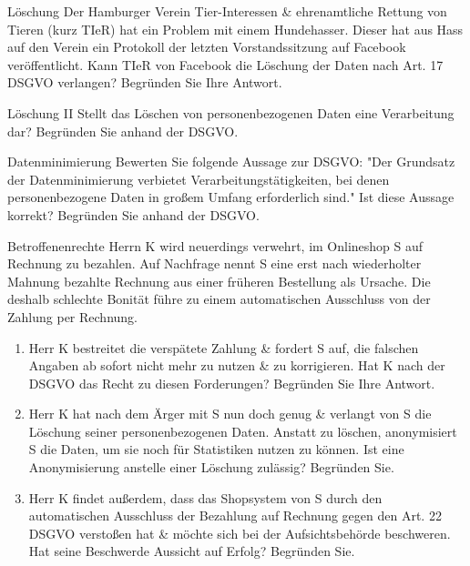 \documentclass{exercisesheet}
\begin{document}
  \begin{exercise*}{Löschung}
    Der Hamburger Verein Tier-Interessen \& ehrenamtliche Rettung von Tieren (kurz TIeR) hat ein Problem mit einem Hundehasser. Dieser hat aus Hass auf den Verein ein Protokoll der letzten Vorstandssitzung auf Facebook veröffentlicht. Kann TIeR von Facebook die Löschung der Daten nach Art. 17 DSGVO verlangen? Begründen Sie Ihre Antwort.
  \end{exercise*}

  \begin{exercise*}{Löschung II}
    Stellt das Löschen von personenbezogenen Daten eine Verarbeitung dar? Begründen Sie anhand der DSGVO.
  \end{exercise*}

  \begin{exercise*}{Datenminimierung}
    Bewerten Sie folgende Aussage zur DSGVO: "Der Grundsatz der Datenminimierung verbietet Verarbeitungstätigkeiten, bei denen personenbezogene Daten in großem Umfang erforderlich sind." Ist diese Aussage korrekt? Begründen Sie anhand der DSGVO.
  \end{exercise*}

  \begin{exercise*}{Betroffenenrechte}
    Herrn K wird neuerdings verwehrt, im Onlineshop S auf Rechnung zu bezahlen. Auf Nachfrage nennt S eine erst nach wiederholter Mahnung bezahlte Rechnung aus einer früheren Bestellung als Ursache. Die deshalb schlechte Bonität führe zu einem automatischen Ausschluss von der Zahlung per Rechnung.
    \begin{enumerate}
      \item Herr K bestreitet die verspätete Zahlung \& fordert S auf, die falschen Angaben ab sofort nicht mehr zu nutzen \& zu korrigieren. Hat K nach der DSGVO das Recht zu diesen Forderungen? Begründen Sie Ihre Antwort.
      \item Herr K hat nach dem Ärger mit S nun doch genug \& verlangt von S die Löschung seiner personenbezogenen Daten. Anstatt zu löschen, anonymisiert S die Daten, um sie noch für Statistiken nutzen zu können. Ist eine Anonymisierung anstelle einer Löschung zulässig? Begründen Sie.
      \item Herr K findet außerdem, dass das Shopsystem von S durch den automatischen Ausschluss der Bezahlung auf Rechnung gegen den Art. 22 DSGVO verstoßen hat \& möchte sich bei der Aufsichtsbehörde beschweren. Hat seine Beschwerde Aussicht auf Erfolg? Begründen Sie.
    \end{enumerate}
  \end{exercise*}
\end{document}
